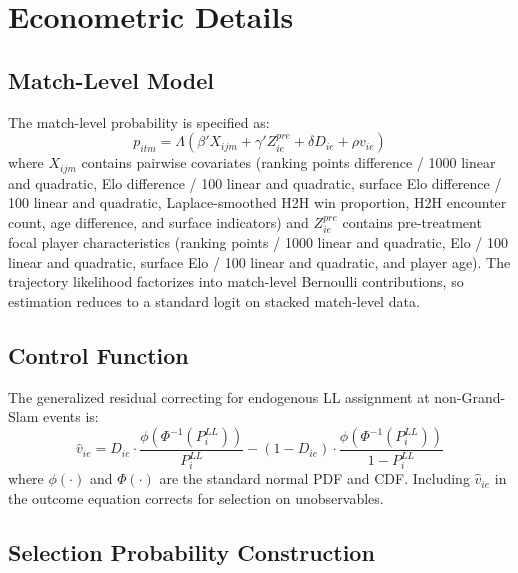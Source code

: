 \section{Econometric Details}
\label{app:details}

\subsection{Match-Level Model}
\label{app:match_model}

The match-level probability is specified as:
\begin{equation}
p_{itm} = \Lambda(\beta' X_{ijm} + \gamma' Z^{pre}_{ie} + \delta D_{ie} + \rho v_{ie})
\end{equation}
where $X_{ijm}$ contains pairwise covariates (ranking points difference / 1000 linear and quadratic, Elo difference / 100 linear and quadratic, surface Elo difference / 100 linear and quadratic, Laplace-smoothed H2H win proportion, H2H encounter count, age difference, and surface indicators) and $Z^{pre}_{ie}$ contains pre-treatment focal player characteristics (ranking points / 1000 linear and quadratic, Elo / 100 linear and quadratic, surface Elo / 100 linear and quadratic, and player age). The trajectory likelihood factorizes into match-level Bernoulli contributions, so estimation reduces to a standard logit on stacked match-level data.

\subsection{Control Function}
\label{app:first_stage}

The generalized residual correcting for endogenous LL assignment at non-Grand-Slam events is:
\begin{equation}
\hat{v}_{ie} = D_{ie} \cdot \frac{\phi(\Phi^{-1}(P_i^{LL}))}{P_i^{LL}} - (1 - D_{ie}) \cdot \frac{\phi(\Phi^{-1}(P_i^{LL}))}{1 - P_i^{LL}}
\end{equation}
where $\phi(\cdot)$ and $\Phi(\cdot)$ are the standard normal PDF and CDF. Including $\hat{v}_{ie}$ in the outcome equation corrects for selection on unobservables.

\subsection{Selection Probability Construction}
\label{app:instrument}

